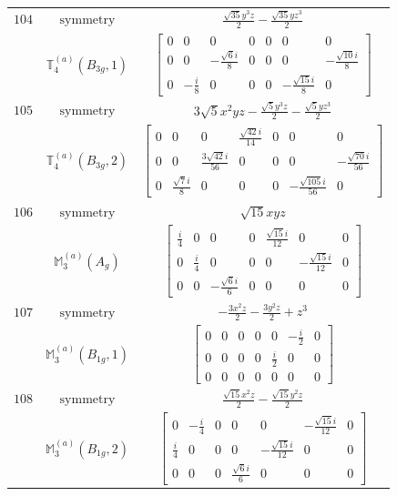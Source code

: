 \documentclass[fleqn,8pt,landscape]{jsarticle}
\begin{document}
\begin{longtable}{ccc}
$ 104 $ & $ \text{symmetry} $ & $ \frac{\sqrt{35} y^{3} z}{2} - \frac{\sqrt{35} y z^{3}}{2} $ \\
$  $ & $ \mathbb{T}_{4}^{(a)}(B_{3g},1) $ & $ \begin{bmatrix} 0 & 0 & 0 & 0 & 0 & 0 & 0 \\ 0 & 0 & - \frac{\sqrt{6} i}{8} & 0 & 0 & 0 & - \frac{\sqrt{10} i}{8} \\ 0 & - \frac{i}{8} & 0 & 0 & 0 & - \frac{\sqrt{15} i}{8} & 0 \end{bmatrix} $ \\ \hline
$ 105 $ & $ \text{symmetry} $ & $ 3 \sqrt{5} x^{2} y z - \frac{\sqrt{5} y^{3} z}{2} - \frac{\sqrt{5} y z^{3}}{2} $ \\
$  $ & $ \mathbb{T}_{4}^{(a)}(B_{3g},2) $ & $ \begin{bmatrix} 0 & 0 & 0 & \frac{\sqrt{42} i}{14} & 0 & 0 & 0 \\ 0 & 0 & \frac{3 \sqrt{42} i}{56} & 0 & 0 & 0 & - \frac{\sqrt{70} i}{56} \\ 0 & \frac{\sqrt{7} i}{8} & 0 & 0 & 0 & - \frac{\sqrt{105} i}{56} & 0 \end{bmatrix} $ \\ \hline
$ 106 $ & $ \text{symmetry} $ & $ \sqrt{15} x y z $ \\
$  $ & $ \mathbb{M}_{3}^{(a)}(A_{g}) $ & $ \begin{bmatrix} \frac{i}{4} & 0 & 0 & 0 & \frac{\sqrt{15} i}{12} & 0 & 0 \\ 0 & \frac{i}{4} & 0 & 0 & 0 & - \frac{\sqrt{15} i}{12} & 0 \\ 0 & 0 & - \frac{\sqrt{6} i}{6} & 0 & 0 & 0 & 0 \end{bmatrix} $ \\ \hline
$ 107 $ & $ \text{symmetry} $ & $ - \frac{3 x^{2} z}{2} - \frac{3 y^{2} z}{2} + z^{3} $ \\
$  $ & $ \mathbb{M}_{3}^{(a)}(B_{1g},1) $ & $ \begin{bmatrix} 0 & 0 & 0 & 0 & 0 & - \frac{i}{2} & 0 \\ 0 & 0 & 0 & 0 & \frac{i}{2} & 0 & 0 \\ 0 & 0 & 0 & 0 & 0 & 0 & 0 \end{bmatrix} $ \\ \hline
$ 108 $ & $ \text{symmetry} $ & $ \frac{\sqrt{15} x^{2} z}{2} - \frac{\sqrt{15} y^{2} z}{2} $ \\
$  $ & $ \mathbb{M}_{3}^{(a)}(B_{1g},2) $ & $ \begin{bmatrix} 0 & - \frac{i}{4} & 0 & 0 & 0 & - \frac{\sqrt{15} i}{12} & 0 \\ \frac{i}{4} & 0 & 0 & 0 & - \frac{\sqrt{15} i}{12} & 0 & 0 \\ 0 & 0 & 0 & \frac{\sqrt{6} i}{6} & 0 & 0 & 0 \end{bmatrix} $ \\ \hline

\end{longtable}
\end{document}
